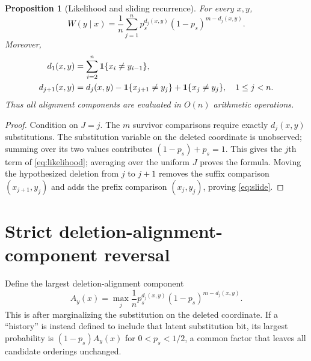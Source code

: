 \documentclass[11pt]{article}
\newtheorem{proposition}[theorem]{Proposition}
\theoremstyle{remark}\newtheorem{remark}[theorem]{Remark}
\begin{document}
\begin{proposition}[Likelihood and sliding recurrence]\label{prop:like}
For every $x,y$,
\begin{equation}
 W(y\mid x)=\frac1n\sum_{j=1}^{n}p_s^{d_j(x,y)}(1-p_s)^{m-d_j(x,y)}. \label{eq:likelihood}
\end{equation}
Moreover,
\begin{align}
 d_1(x,y)&=\sum_{i=2}^{n}\mathbf 1\{x_i\ne y_{i-1}\},\label{eq:d1}\\
 d_{j+1}(x,y)&=d_j(x,y)-\mathbf 1\{x_{j+1}\ne y_j\}+\mathbf 1\{x_j\ne y_j\},\quad 1\le j<n. \label{eq:slide}
\end{align}
Thus all alignment components are evaluated in $O(n)$ arithmetic operations.
\end{proposition}
\begin{proof}
Condition on $J=j$. The $m$ survivor comparisons require exactly $d_j(x,y)$ substitutions. The
substitution variable on the deleted coordinate is unobserved; summing over its two values contributes
$(1-p_s)+p_s=1$. This gives the $j$th term of \eqref{eq:likelihood}; averaging over the uniform
$J$ proves the formula. Moving the hypothesized deletion from $j$ to $j+1$ removes the suffix
comparison $(x_{j+1},y_j)$ and adds the prefix comparison $(x_j,y_j)$, proving \eqref{eq:slide}.
\end{proof}

\section{Strict deletion-alignment-component reversal}
Define the largest deletion-alignment component
\begin{equation}
 A_y(x)=\max_j\frac1n p_s^{d_j(x,y)}(1-p_s)^{m-d_j(x,y)}. \label{eq:Ay}
\end{equation}
This is after marginalizing the substitution on the deleted coordinate. If a ``history'' is instead
defined to include that latent substitution bit, its largest probability is $(1-p_s)A_y(x)$ for
$0<p_s<1/2$, a common factor that leaves all candidate orderings unchanged.
\end{document}
